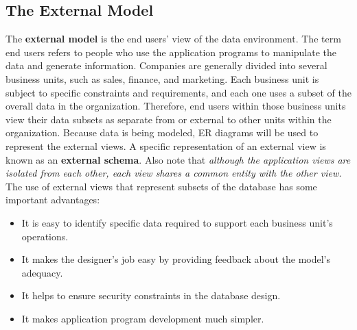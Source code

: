 \documentclass[a4paper, 12pt, titlepage]{report}
\begin{document}
\subsection{The External Model}
The \textbf{external model} is the end users’ view of the data environment. The term end users refers to people who use the application programs to manipulate the data and generate information. Companies are generally divided into several business units, such as sales, finance, and marketing. Each business unit is subject to specific constraints and requirements, and each one uses a subset of the overall data in the organization. Therefore, end users within those business units view their data subsets as separate from or external to other units within the organization. Because data is being modeled, ER diagrams will be used to represent the external views. A specific representation of an external view is known as an \textbf{external schema}. Also note that \emph{although the application views are isolated from each other, each view shares a common entity with the other view.}
The use of external views that represent subsets of the database has some important advantages:
\begin{itemize}
\item It is easy to identify specific data required to support each business unit’s operations.
\item It makes the designer’s job easy by providing feedback about the model’s adequacy.
\item It helps to ensure security constraints in the database design.
\item It makes application program development much simpler.
\end{itemize}
\end{document}
